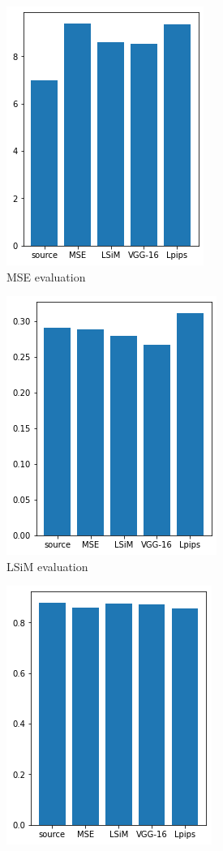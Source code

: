 \documentclass[a4paper,12pt,twoside]{report}
\begin{document}
\begin{figure}
\begin{subfigure}{0.32\textwidth}
			\includegraphics[scale=0.49]{buoyancy_low/mse_eval.png}
			\caption{MSE evaluation}
		\end{subfigure}
		\begin{subfigure}{0.32\textwidth}
			\centering
			\includegraphics[scale=0.49]{buoyancy_low/lsim_eval.png}
			\caption{LSiM evaluation}
		\end{subfigure}
		\begin{subfigure}{0.32\textwidth}
			\centering
			\includegraphics[scale=0.49]{buoyancy_low/ssim.png}

\end{subfigure}
\end{figure}
\end{document}
